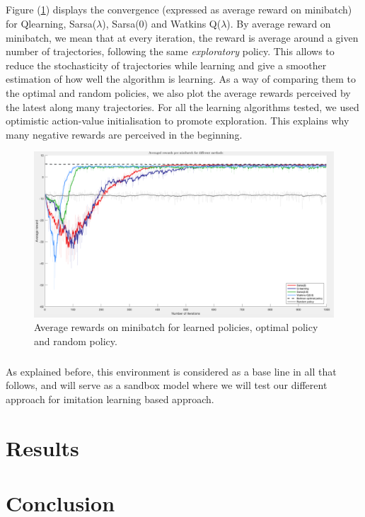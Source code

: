 \documentclass[a4paper]{report}
\begin{document}
{{			
						
			\paragraph{} Figure (\ref{fig::comp_maze}) displays the convergence (expressed as average reward on minibatch) for Qlearning, Sarsa($\lambda$), Sarsa(0) and Watkins Q($\lambda$). By average reward on minibatch, we mean that at every iteration, the reward is average around a given number of trajectories, following the same \emph{exploratory} policy. This allows to reduce the stochasticity of trajectories while learning and give a smoother estimation of how well the algorithm is learning. As a way of comparing them to the optimal and random policies, we also plot the average rewards perceived by the latest along many trajectories. \newline
For all the learning algorithms tested, we used optimistic action-value initialisation to promote exploration. This explains why many negative rewards are perceived in the beginning. 
				
			\begin{figure}
				\begin{center}
					\includegraphics[width=\linewidth]{comp_maze}
					\caption{Average rewards on minibatch for learned policies, optimal policy and random policy.}
					\label{fig::comp_maze}
				\end{center}
			\end{figure}
		}
		
		\paragraph{} As explained before, this environment is considered as a base line in all that follows, and will serve as a sandbox model where we will test our different approach for imitation learning based approach. 
	}
	
	\chapter{Results}
	{
	
	}
	
	\chapter*{Conclusion}
	
	
	
 	 
	 \nocite{*}
  
\end{document}
